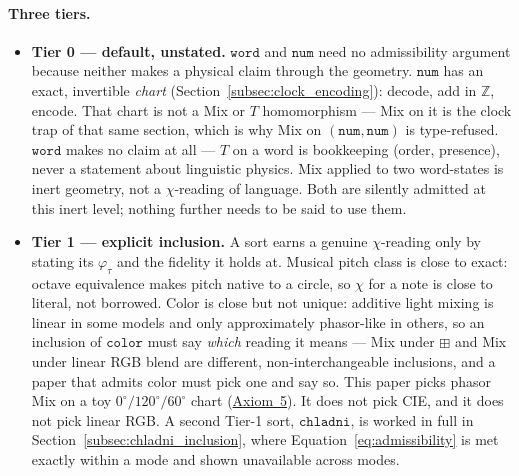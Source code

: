 \documentclass[12pt, a4paper]{article}
\begin{document}
\paragraph{Three tiers.}
\begin{itemize}
    \item \textbf{Tier 0 --- default, unstated.} $\mathtt{word}$ and
    $\mathtt{num}$ need no admissibility argument because neither
    makes a physical claim through the geometry. $\mathtt{num}$
    has an exact, invertible \emph{chart}
    (Section~\ref{subsec:clock_encoding}): decode, add in
    $\mathbb{Z}$, encode. That chart is not a Mix or $T$
    homomorphism --- Mix on it is the clock trap of that same
    section, which is why Mix on $(\mathtt{num},\mathtt{num})$ is
    type-refused. $\mathtt{word}$ makes no claim at all --- $T$ on a
    word is bookkeeping (order, presence), never a statement about
    linguistic physics. Mix applied to two word-states is inert
    geometry, not a $\chi$-reading of language. Both are silently
    admitted at this inert level; nothing further needs to be said
    to use them.

    \item \textbf{Tier 1 --- explicit inclusion.} A sort earns a
    genuine $\chi$-reading only by stating its $\varphi_\tau$ and the
    fidelity it holds at. Musical pitch class is close to exact:
    octave equivalence makes pitch native to a circle, so $\chi$ for
    a note is close to literal, not borrowed. Color is close but not
    unique: additive light mixing is linear in some models and only
    approximately phasor-like in others, so an inclusion of
    $\mathtt{color}$ must say \emph{which} reading it means --- Mix
    under $\boxplus$ and Mix under linear RGB blend are different,
    non-interchangeable inclusions, and a paper that admits color
    must pick one and say so. This paper picks phasor Mix on a toy
    $0^\circ/120^\circ/60^\circ$ chart
    (\hyperref[subsec:axiom_interference]{Axiom~5}). It does not pick CIE,
    and it does not pick linear RGB. A second Tier-1 sort,
    $\mathtt{chladni}$, is worked in full in
    Section~\ref{subsec:chladni_inclusion}, where
    Equation~\eqref{eq:admissibility} is met exactly within a mode
    and shown unavailable across modes.


\end{itemize}
\end{document}
